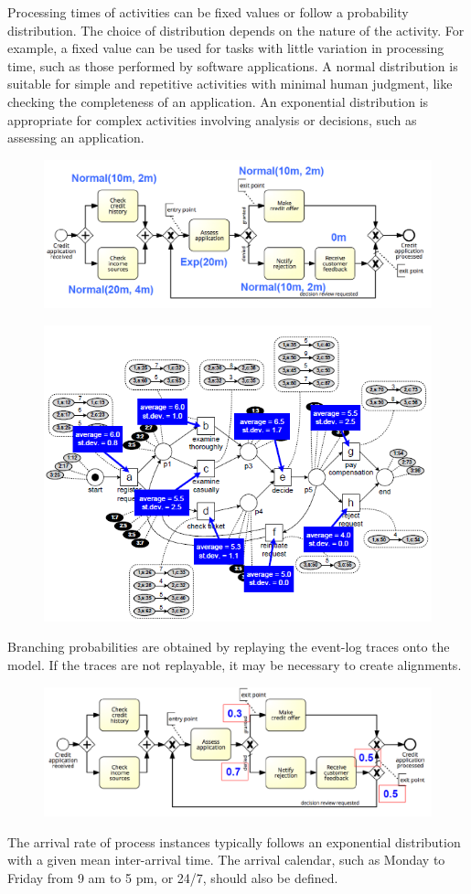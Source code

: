 Processing times of activities can be fixed values or follow a probability distribution. The choice of distribution depends on the nature of the activity. For example, a fixed value can be used for tasks with little variation in processing time, such as those performed by software applications. A normal distribution is suitable for simple and repetitive activities with minimal human judgment, like checking the completeness of an application. An exponential distribution is appropriate for complex activities involving analysis or decisions, such as assessing an application.
\begin{figure}[h!]
    \centering
    \includegraphics[width=0.75\linewidth]{capitolo 10/2.png}
\end{figure}
\begin{figure}[h!]
    \centering
    \includegraphics[width=0.75\linewidth]{capitolo 10/3.png}
\end{figure}

Branching probabilities are obtained by replaying the event-log traces onto the model. If the traces are not replayable, it may be necessary to create alignments.
\begin{figure}[h!]
    \centering
    \includegraphics[width=0.75\linewidth]{capitolo 10/4.png}
\end{figure}
The arrival rate of process instances typically follows an exponential distribution with a given mean inter-arrival time. The arrival calendar, such as Monday to Friday from 9 am to 5 pm, or 24/7, should also be defined.

